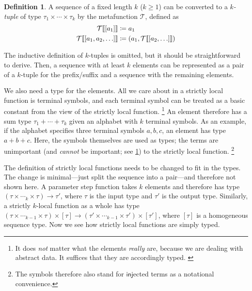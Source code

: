 \documentclass[11pt]{article}
\theoremstyle{definition}
\newtheorem{definition}{Definition}
\theoremstyle{plain}
\newcommand{\coloneq}{\mathrel{\vcentcolon\mkern-1.2mu=}}
\newcommand{\metab}[1]{\llbracket#1\rrbracket}
\begin{document}
\begin{definition}
  A sequence of a fixed length \(k\) (\(k \geq 1\)) can be converted
  to a \emph{\(k\)-tuple} of type
  \(\tau_{1} \times \cdots \times \tau_{k}\) by the metafunction
  \(\mathcal{T}\), defined
  as \begin{align*}
    \mathcal{T}\metab{[a_{1}]}
      &\coloneq a_{1} \\
    \mathcal{T}\metab{[a_{1}, a_{2}, \ldots]}
      &\coloneq (a_{1}, \mathcal{T}\metab{[a_{2}, \ldots]})
  \end{align*}
\end{definition}

The inductive definition of \(k\)-tuples is omitted, but it should be
straightforward to derive.  Then, a sequence with at least \(k\)
elements can be represented as a pair of a \(k\)-tuple for the
prefix/suffix and a sequence with the remaining elements.

We also need a type for the elements.  All we care about in a strictly
local function is terminal symbols, and each terminal symbol can be
treated as a basic constant from the view of the strictly local
function.%
\footnote{It does \emph{not} matter what the elements \emph{really}
  are, because we are dealing with abstract data.  It suffices that
  they are accordingly typed.
  \label{fn:abs-data}}
%
An element therefore has a sum type \(\tau_{1} + \cdots + \tau_{k}\)
given an alphabet with \(k\) terminal symbols.  As an example, if the
alphabet specifies three terminal symbols \(a, b, c\), an element has
type \(a + b + c\).  Here, the symbols themselves are used as types;
the terms are unimportant (and \emph{cannot} be important; see
\cref{fn:abs-data}) to the strictly local function.%
\footnote{The symbols therefore also stand for \(\mathsf{inj}\)ected
  terms as a notational convenience.}

The definition of strictly local functions needs to be changed to fit
in the types.  The change is minimal---just split the sequence into a
pair---and therefore not shown here.  A parameter step function takes
\(k\) elements and therefore has type
\((\tau \times \cdots_{k} \times \tau) \to \tau'\), where \(\tau\) is
the input type and \(\tau'\) is the output type.  Similarly, a
strictly \(k\)-local function as a whole has type
\((\tau \times \cdots_{k-1} \times \tau) \times [\tau]
\to (\tau' \times \cdots_{k-1} \times \tau') \times [\tau']\),
where \([\tau]\) is a homogeneous sequence type.  Now we see how
strictly local functions are simply typed.
\end{document}
